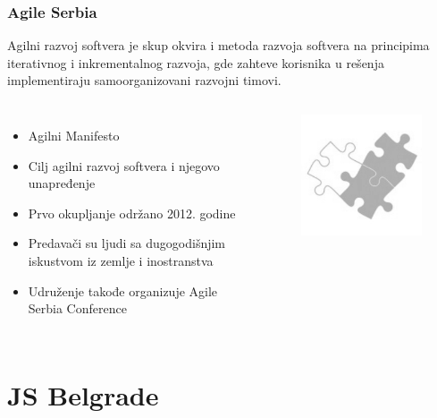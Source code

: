 \documentclass[hyperref={bookmarks=false},aspectratio=169]{beamer}
\begin{document}
\begin{frame}
\frametitle{Agile Serbia}

Agilni razvoj softvera je skup okvira i metoda razvoja softvera na principima iterativnog i inkrementalnog razvoja, gde zahteve korisnika u rešenja implementiraju samoorganizovani razvojni timovi.


\begin{columns}[T]

\begin{itemize}
    \item Agilni Manifesto
    \item Cilj agilni razvoj softvera i njegovo unapređenje
    \item Prvo okupljanje održano 2012. godine
    \item Predavači su ljudi sa dugogodišnjim iskustvom iz zemlje i inostranstva
    \item Udruženje takođe organizuje Agile Serbia Conference 
\end{itemize}



\begin{figure}
    \raggedleft
    \includegraphics[scale=0.4]{./images/agile_srb.png}
\end{figure}

\end{columns}
\end{frame}

\section{JS Belgrade}
\end{document}
